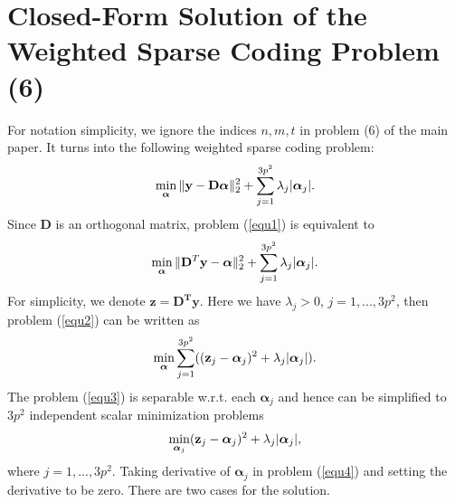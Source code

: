 \documentclass[10pt,onecolumn,letterpaper]{article}
\begin{document}
\section{Closed-Form Solution of the Weighted Sparse Coding Problem (6)}
For notation simplicity, we ignore the indices $n,m,t$ in problem (6) of the main paper. It turns into the following weighted sparse coding problem:
\vspace{-4mm}
\begin{equation}\label{equ1}\vspace{-2mm}
\min_{\bm{\alpha}}\|\mathbf{y}-\mathbf{D}\bm{\alpha}\|_{2}^{2}+\sum_{j=1}^{3p^2}\lambda_{j}|\bm{\alpha}_{j}|.
\end{equation}
Since $\mathbf{D}$ is an orthogonal matrix, problem (\ref{equ1}) is equivalent to 
\vspace{-2mm}
\begin{equation}\label{equ2}\vspace{-2mm}
\min_{\bm{\alpha}}\|\mathbf{D}^{T}\mathbf{y}-\bm{\alpha}\|_{2}^{2}+\sum_{j=1}^{3p^2}\lambda_{j}|\bm{\alpha}_{j}|.
\end{equation}
For simplicity, we denote $\mathbf{z} = \mathbf{D^{T}y}$. Here we have $\lambda_{j}>0$, $j=1,...,3p^2$, then problem (\ref{equ2}) can be written as
\vspace{-2mm}
\begin{equation}\label{equ3}\vspace{-2mm}
\min_{\boldsymbol{\alpha}}\sum_{j=1}^{3p^2}((\mathbf{z}_{j}-\bm{\alpha}_{j})^{2}+\lambda_{j}|\bm{\alpha}_{j}|).
\end{equation}
The problem (\ref{equ3}) is separable w.r.t. each $\bm{\alpha}_{j}$ and hence can be simplified to $3p^2$ independent  scalar minimization problems
\vspace{-2mm}
\begin{equation}\label{equ4}\vspace{-2mm}
\min_{\bm{\alpha}_{j}}(\mathbf{z}_{j}-\bm{\alpha}_{j})^{2}+\lambda_{j}|\bm{\alpha}_{j}|,
\end{equation}
where $j=1,...,3p^2$. Taking derivative of $\boldsymbol{\alpha}_{j}$ in problem (\ref{equ4}) and setting the derivative to be zero. There are two cases for the solution.
\end{document}
